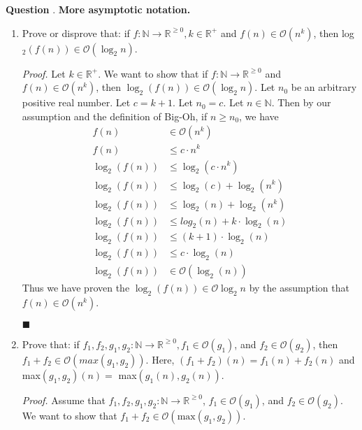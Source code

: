 \documentclass{article}
\newcounter{qcount}
\newcommand\q{\stepcounter{qcount} \textbf{Question \theqcount}. }
\newcommand\qedsymbol{\hfill$\blacksquare$}
\begin{document}
\newpage
\q \textbf{More asymptotic notation.}
\begin{enumerate}[label = (\alph*)]
    \item Prove or disprove that: if $f : \mathbb{N} \rightarrow \mathbb{R}^
        {\geq 0}, k \in \mathbb{R}^+$ and $f (n) \in \mathcal{O} (n^k)$, then 
        log$_2 (f (n)) \in \mathcal{O} (\log_2n)$.

        \textit{Proof.} Let $k \in \mathbb{R}^+$. We want to show that 
        if $f : \mathbb{N} \rightarrow \mathbb{R}^ {\geq 0}$ and 
        $f (n) \in \mathcal{O} (n^k)$, then $\log_2 (f(n)) \in \mathcal{O}
        (\log_2 n)$. Let $n_0$ be an arbitrary positive real number. Let 
        $c = k + 1$. Let $n_0 = c$. Let $n \in \mathbb{N}$. Then 
        by our assumption and the definition of Big-Oh, if $n \geq n_0$, we have 
        \begin{align*}
            f (n) &\in \mathcal{O} (n ^k) \\
            f (n) &\leq c \cdot n^k  \\
            \log_2 ( f (n)) &\leq \log_2 (c\cdot n^k) \\
            \log_2 (f (n )) &\leq \log_2 (c) + \log_2 (n^k) \tag*{(Using log identity)} \\
            \log_2 (f (n)) &\leq \log_2 (n) + \log_2 (n^k) \tag*{(Since $n \geq c$)} \\
            \log_2 (f (n)) &\leq log_2(n) + k \cdot \log_2 (n) \\
            \log_2 (f (n)) &\leq (k+1) \cdot \log_2 (n) \\
            \log_2 (f (n)) &\leq c \cdot \log_2 (n) \\ 
            \log_2 (f (n)) &\in \mathcal{O} (\log_2 (n))
        \end{align*}
        Thus we have proven the $\log_2 (f (n)) \in \mathcal{O} \log_2 n$ 
        by the assumption that $f (n) \in \mathcal{O} (n^k)$. 

        \qedsymbol

    \item Prove that: if $f_1, f_2, g_1, g_2: \mathbb{N} \rightarrow \mathbb{R}^ {\geq 0}
        , f_1 \in \mathcal{O} (g_1)$, and $f_2 \in \mathcal{O} (g_2)$, then 
        $f_1 + f_2 \in \mathcal{O} (max (g_1, g_2))$. Here, $ (f_1 + f_2) (n)
        = f_1 (n) + f_2 (n)$ and max$ (g_1, g_2) (n) =$ max$(g_1 (n), g_2 (n))$.
        
        \textit{Proof.} Assume that $f_1 , f_2, g_1, g_2: \mathbb{N} \rightarrow 
        \mathbb{R}^ {\geq 0}$, $f_1 \in \mathcal{O} (g_1)$, and 
        $f_2 \in \mathcal{O} (g_2)$. We want to show that 
        $f_1 + f_2 \in \mathcal{O} (\text{max}(g_1, g_2))$. 


\end{enumerate}
\end{document}
